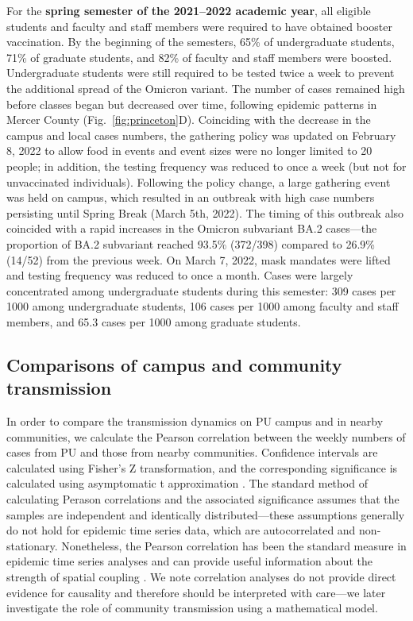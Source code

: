 \documentclass[12pt]{article}
\newcommand{\fref}[1]{Fig.~\ref{fig:#1}}
\begin{document}
For the \textbf{spring semester of the 2021--2022 academic year}, all eligible students and faculty and staff members were required to have obtained booster vaccination.
By the beginning of the semesters, 65\% of undergraduate students, 71\% of graduate students, and 82\% of faculty and staff members were boosted.
Undergraduate students were still required to be tested twice a week to prevent the additional spread of the Omicron variant.
The number of cases remained high before classes began but decreased over time, following epidemic patterns in Mercer County (\fref{princeton}D).
Coinciding with the decrease in the campus and local cases numbers, the gathering policy was updated on February 8, 2022 to allow food in events and event sizes were no longer limited to 20 people;
in addition, the testing frequency was reduced to once a week (but not for unvaccinated individuals).
Following the policy change, a large gathering event was held on campus, which resulted in an outbreak with high case numbers persisting until Spring Break (March 5th, 2022).
The timing of this outbreak also coincided with a rapid increases in the Omicron subvariant BA.2 cases---the proportion of BA.2 subvariant reached 93.5\% (372/398) compared to 26.9\% (14/52) from the previous week.
On March 7, 2022, mask mandates were lifted and testing frequency was reduced to once a month.
Cases were largely concentrated among undergraduate students during this semester: 309 cases per 1000 among undergraduate students, 106 cases per 1000 among faculty and staff members, and 65.3 cases per 1000 among graduate students.

\subsection*{Comparisons of campus and community transmission}

In order to compare the transmission dynamics on PU campus and in nearby communities, we calculate the Pearson correlation between the weekly numbers of cases from PU and those from nearby communities.
Confidence intervals are calculated using Fisher's Z transformation, and the corresponding significance is calculated using asymptomatic t approximation \citep{hollander2013nonparametric}.
The standard method of calculating Perason correlations and the associated significance assumes that the samples are independent and identically distributed---these assumptions generally do not hold for epidemic time series data, which are autocorrelated and non-stationary.
Nonetheless, the Pearson correlation has been the standard measure in epidemic time series analyses and can provide useful information about the strength of spatial coupling \citep{rohani1999opposite,grenfell2001travelling,viboud2006synchrony,baker2019epidemic}.
We note correlation analyses do not provide direct evidence for causality and therefore should be interpreted with care---we later investigate the role of community transmission using a mathematical model.
\end{document}
